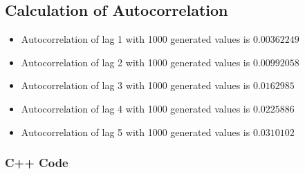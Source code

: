 \documentclass[10pt]{article}
\begin{document}
\subsection{Calculation of Autocorrelation}
\begin{itemize}
\item Autocorrelation of lag 1 with 1000 generated values is $ 0.00362249 $
\item Autocorrelation of lag 2 with 1000 generated values is $ 0.00992058 $
\item Autocorrelation of lag 3 with 1000 generated values is $ 0.0162985 $
\item Autocorrelation of lag 4 with 1000 generated values is $ 0.0225886 $
\item Autocorrelation of lag 5 with 1000 generated values is $ 0.0310102 $
\end{itemize}

\subsubsection{C++ Code}

\end{document}
